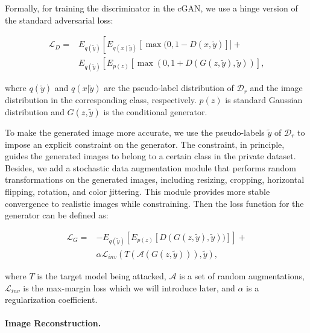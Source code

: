 \documentclass[letterpaper]{article} %
\begin{document}
Formally, for training the discriminator in the cGAN, we use a hinge version of the standard adversarial loss:
\begin{linenomath*}
\begin{equation}\label{eq:D_loss}
\begin{aligned}
\mathcal{L}_{D}=&E_{q(\tilde{y})}\left[E_{q(x \mid \tilde{y})}[\max (0,1-D(x, \tilde{y})]]+\right. \\
&E_{q(\tilde{y})}\left[E_{p(z)}[\max (0,1+D(G(z, \tilde{y}), \tilde{y}))],\right.
\end{aligned}
\end{equation}
\end{linenomath*}
where $q(\tilde{y})$ and $q(x|\tilde{y})$ are the pseudo-label distribution of \textbf{$\mathcal{D}_{r}$} and the image distribution in the corresponding class, respectively. $p(z)$ is standard Gaussian distribution and $G(z, \tilde{y})$ is the conditional generator.

To make the generated image more accurate, we use the pseudo-labels $\tilde{y}$ of $\mathcal{D}_r$ to impose an explicit constraint on the generator. The constraint, in principle, guides the generated images to belong to a certain class in the private dataset. Besides, we add a stochastic data augmentation module that performs random transformations on the generated images, including resizing, cropping, horizontal flipping, rotation, and color jittering. This module provides more stable convergence to realistic images while constraining. Then the loss function for the generator can be defined as:
\begin{linenomath*}
\begin{equation}\label{eq:G_loss}
\begin{aligned}
\mathcal{L}_{G} =& -E_{q(\tilde{y})}\left[E_{p(z)}\left[D(G(z, \tilde{y}), \tilde{y}))\right]\right] + \\
&\alpha \mathcal{L}_{inv}(T(\mathcal{A}(G(z, \tilde{y}))), \tilde{y}),
\end{aligned}
\end{equation}
\end{linenomath*}
where $T$ is the target model being attacked, $\mathcal{A}$ is a set of random augmentations, $\mathcal{L}_{inv}$ is the max-margin loss which we will introduce later, and $\alpha$ is a regularization coefficient.


\paragraph{Image Reconstruction.}
\end{document}
